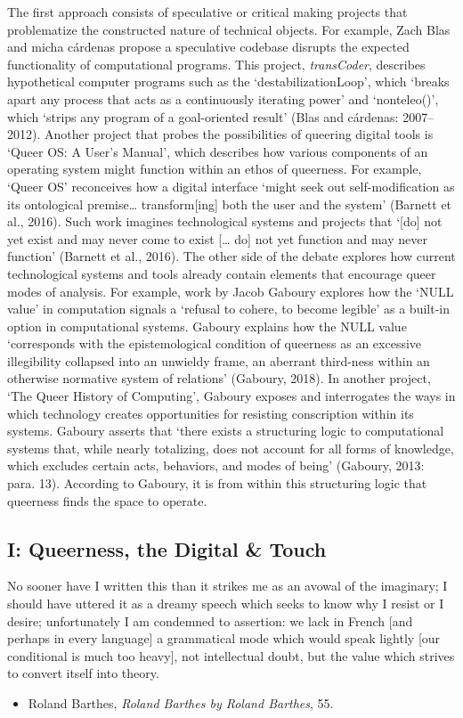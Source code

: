 \documentclass[11pt]{article}
\begin{document}
The first approach consists of speculative or critical making projects
that problematize the constructed nature of technical objects. For
example, Zach Blas and micha cárdenas propose a speculative codebase
disrupts the expected functionality of computational programs. This
project, \emph{transCoder}, describes hypothetical computer programs such
as the ‘destabilizationLoop', which ‘breaks apart any process that
acts as a continuously iterating power' and ‘nonteleo()', which
‘strips any program of a goal-oriented result' (Blas and cárdenas:
2007--2012). Another project that probes the possibilities of queering
digital tools is ‘Queer OS: A User's Manual', which describes how
various components of an operating system might function within an
ethos of queerness. For example, ‘Queer OS' reconceives how a digital
interface ‘might seek out self-modification as its ontological
premise\ldots{} transform[ing] both the user and the system' (Barnett et
al., 2016). Such work imagines technological systems and projects that
‘[do] not yet exist and may never come to exist [\ldots{} do] not yet
function and may never function' (Barnett et al., 2016). The other
side of the debate explores how current technological systems and
tools already contain elements that encourage queer modes of analysis.
For example, work by Jacob Gaboury explores how the ‘NULL value' in
computation signals a ‘refusal to cohere, to become legible' as a
built-in option in computational systems. Gaboury explains how the
NULL value ‘corresponds with the epistemological condition of
queerness as an excessive illegibility collapsed into an unwieldy
frame, an aberrant third-ness within an otherwise normative system of
relations' (Gaboury, 2018). In another project, ‘The Queer History of
Computing', Gaboury exposes and interrogates the ways in which
technology creates opportunities for resisting conscription within its
systems. Gaboury asserts that ‘there exists a structuring logic to
computational systems that, while nearly totalizing, does not account
for all forms of knowledge, which excludes certain acts, behaviors,
and modes of being' (Gaboury, 2013: para. 13). According to Gaboury,
it is from within this structuring logic that queerness finds the
space to operate.

\subsection{I: Queerness, the Digital \& Touch}
\label{sec:orge13a8b1}
No sooner have I written this than it strikes me as an avowal of the
imaginary; I should have uttered it as a dreamy speech which seeks to
know why I resist or I desire; unfortunately I am condemned to
assertion: we lack in French [and perhaps in every language] a
grammatical mode which would speak lightly [our conditional is much
too heavy], not intellectual doubt, but the value which strives to
convert itself into theory.
\begin{itemize}
\item Roland Barthes, \emph{Roland Barthes by Roland Barthes}, 55.
\end{itemize}
\end{document}
